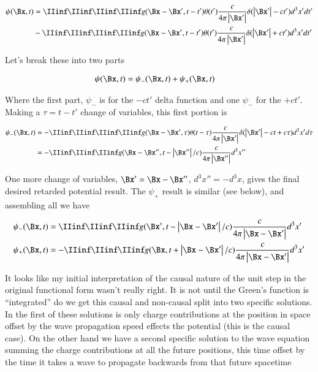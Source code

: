 \begin{align*}
{\psi}(\Bx, t)
&=
\IIinf \IIinf \IIinf \IIinf g(\Bx - \Bx', t - t') \theta(t') \frac{c }{4\pi \Abs{\Bx'}} \delta(\Abs{\Bx'} - c t') d^3 x' dt' \\
&-\IIinf \IIinf \IIinf \IIinf g(\Bx - \Bx', t - t') \theta(t') \frac{c }{4\pi \Abs{\Bx'}} \delta(\Abs{\Bx'} + c t') d^3 x' dt' \\
\end{align*}

Let's break these into two parts

\begin{align}\label{eqn:poisson:almostThere}
{\psi}(\Bx, t) &= {\psi}_{-}(\Bx, t) +{\psi}_{+}(\Bx, t)
\end{align}

Where the first part, $\psi_{-}$ is for the $-ct'$ delta function and one $\psi_{-}$ for the $+ct'$.
Making a $\tau = t-t'$ change of variables, this first portion is

\begin{align*}
{\psi}_{-}(\Bx, t)
&= -\IIinf \IIinf \IIinf \IIinf g(\Bx - \Bx', \tau) \theta(t-\tau) \frac{c }{4\pi \Abs{\Bx'}} \delta(\Abs{\Bx'} - c t + c\tau) d^3 x' d\tau \\
&= -\IIinf \IIinf \IIinf g(\Bx - \Bx'', t - \Abs{\Bx''}/c) \frac{c }{4\pi \Abs{\Bx''}} d^3 x'' \\
\end{align*}

One more change of variables, $\Bx' = \Bx - \Bx''$, $d^3 x'' = -d^3 x$, gives the final desired retarded potential result.  The $\psi_{+}$ result is similar (see below), and assembling all we have

\begin{align}
{\psi}_{-}(\Bx, t) &= \IIinf \IIinf \IIinf g(\Bx', t - \Abs{\Bx - \Bx'}/c) \frac{c }{4\pi \Abs{\Bx - \Bx'}} d^3 x' \\
{\psi}_{+}(\Bx, t) &= -\IIinf \IIinf \IIinf g(\Bx, t + \Abs{\Bx -\Bx'}/c) \frac{c }{4\pi \Abs{\Bx -\Bx'}} d^3 x'
\end{align}

It looks like my initial interpretation of the causal nature of the unit step in the original functional form wasn't really right.  It is not
until the Green's function is ``integrated'' do we get this causal and non-causal split into two specific solutions.
In the first of these solutions is only charge contributions at the position in space offset by the wave propagation speed effects the
potential (this is the causal case).  On the other hand we have a second specific solution to the wave equation
summing the charge contributions at all the future positions, this time offset by the time it takes a wave to propagate backwards from that future spacetime

